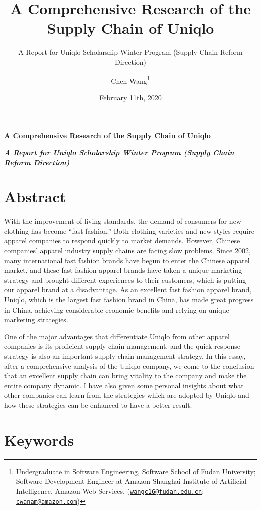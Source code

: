 \documentclass[12pt,]{article}
\title{\vspace{3in} A Comprehensive Research of the Supply Chain of Uniqlo}
\subtitle{A Report for Uniqlo Scholarship Winter Program (Supply Chain Reform
Direction)}
\author{Chen Wang\footnote{Undergraduate in Software Engineering, Software
  School of Fudan University; Software Development Engineer at Amazon
  Shanghai Institute of Artificial Intelligence, Amazon Web Services.
  (\href{mailto:wangc16@fudan.edu.cn}{\nolinkurl{wangc16@fudan.edu.cn}};
  \href{mailto:cwanam@amazon.com}{\nolinkurl{cwanam@amazon.com}})}}
\date{February 11th, 2020}
\begin{document}
\maketitle

\newpage

\LARGE

\begin{center}
\textbf{A Comprehensive Research of the Supply Chain of Uniqlo}
\end{center}

\large
\begin{center}
\textbf{\emph{A Report for Uniqlo Scholarship Winter Program (Supply Chain Reform Direction)}}
\end{center}

\hypertarget{abstract}{%
\section*{Abstract}\label{abstract}}

With the improvement of living standards, the demand of consumers for
new clothing has become ``fast fashion.'' Both clothing varieties and
new styles require apparel companies to respond quickly to market
demands. However, Chinese companies' apparel industry supply chains are
facing slow problems. Since 2002, many international fast fashion brands
have begun to enter the Chinese apparel market, and these fast fashion
apparel brands have taken a unique marketing strategy and brought
different experiences to their customers, which is putting our apparel
brand at a disadvantage. As an excellent fast fashion apparel brand,
Uniqlo, which is the largest fast fashion brand in China, has made great
progress in China, achieving considerable economic benefits and relying
on unique marketing strategies.

One of the major advantages that differentiate Uniqlo from other apparel
companies is its proficient supply chain management. and the quick
response strategy is also an important supply chain management strategy.
In this essay, after a comprehensive analysis of the Uniqlo company, we
come to the conclusion that an excellent supply chain can bring vitality
to the company and make the entire company dynamic. I have also given
some personal insights about what other companies can learn from the
strategies which are adopted by Uniqlo and how these strategies can be
enhanced to have a better result.

\hypertarget{keywords}{%
\section*{Keywords}\label{keywords}}
\end{document}
